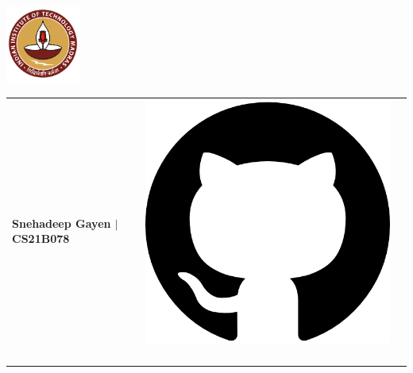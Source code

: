 \documentclass[10pt,article]{article}
\begin{document}
\begin{table}
    \begin{minipage}{0\linewidth}
        \centering
        \includegraphics[height =1in]{Logo.png}
    \end{minipage}
    \begin{minipage}{0.9\linewidth}
        \setlength{\tabcolsep}{70pt}
        \def\arraystretch{1.1}
        \begin{tabular}{l l r}
            \textbf{\Large{Snehadeep Gayen $\vert$ CS21B078}} &
            \multirow{3}{*}{     {\href{https://github.com/Snehadeep-Gayen}{\includegraphics[scale=0.05]{github.png}} \ 
}}
\end{tabular}
\end{minipage}
\end{table}
\end{document}
